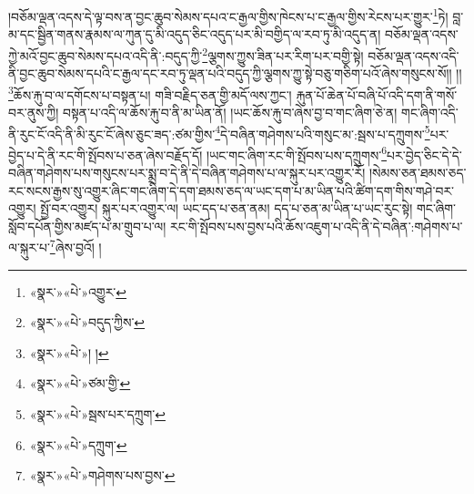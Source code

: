 །བཅོམ་ལྡན་འདས་དེ་ལྟ་བས་ན་བྱང་ཆུབ་སེམས་དཔའ་ང་རྒྱལ་གྱིས་ཁེངས་པ་ང་རྒྱལ་གྱིས་རེངས་པར་གྱུར་\footnote{«སྣར་»«པེ་»འགྱུར་}ཏེ། བླ་མ་དང་སྦྱིན་གནས་རྣམས་ལ་ཀུན་དུ་མི་འདུད་ཅིང་འདུད་པར་མི་བགྱིད་ལ་རབ་ཏུ་མི་འདུད་ན། བཅོམ་ལྡན་འདས་ཀྱེ་མའོ་བྱང་ཆུབ་སེམས་དཔའ་འདི་ནི་:བདུད་ཀྱི་\footnote{«སྣར་»«པེ་»བདུད་ཀྱིས་}ལྕགས་ཀྱུས་ཟིན་པར་རིག་པར་བགྱི་སྟེ། བཅོམ་ལྡན་འདས་འདི་ནི་བྱང་ཆུབ་སེམས་དཔའི་ང་རྒྱལ་དང་རབ་ཏུ་ལྡན་པའི་བདུད་ཀྱི་ལྕགས་ཀྱུ་སྟེ་བཅུ་གཅིག་པའོ་ཞེས་གསུངས་སོ།། །།\footnote{«སྣར་»«པེ་»། །}ཆོས་རྐུ་བ་ལ་དགོངས་པ་བསྟན་པ། གཟི་བརྗིད་ཅན་གྱི་མདོ་ལས་ཀྱང་། རྐུན་པོ་ཆེན་པོ་བཞི་པོ་འདི་དག་ནི་གསོ་བར་ནུས་ཀྱི། བསྟན་པ་འདི་ལ་ཆོས་རྐུ་བ་ནི་མ་ཡིན་ནོ། །ཡང་ཆོས་རྐུ་བ་ཞེས་བྱ་བ་གང་ཞིག་ཅེ་ན། གང་ཞིག་འདི་ནི་རུང་ངོ་འདི་ནི་མི་རུང་ངོ་ཞེས་ཅུང་ཟད་:ཙམ་གྱིས་\footnote{«སྣར་»«པེ་»ཙམ་གྱི་}དེ་བཞིན་གཤེགས་པའི་གསུང་མ་:སྦས་པ་དཀྲུགས་\footnote{«སྣར་»«པེ་»སྦས་པར་དཀྲུག་}པར་བྱེད་པ་དེ་ནི་རང་གི་སྤོབས་པ་ཅན་ཞེས་བརྗོད་དོ། །ཡང་གང་ཞིག་རང་གི་སྤོབས་པས་དཀྲུགས་\footnote{«སྣར་»«པེ་»དཀྲུག་}པར་བྱེད་ཅིང་དེ་དེ་བཞིན་གཤེགས་པས་གསུངས་པར་སྨྲ་བ་དེ་ནི་དེ་བཞིན་གཤེགས་པ་ལ་སྐུར་པར་འགྱུར་རོ། །སེམས་ཅན་ཐམས་ཅད་རང་སངས་རྒྱས་སུ་འགྱུར་ཞིང་གང་ཞིག་དེ་དག་ཐམས་ཅད་ལ་ཡང་དག་པ་མ་ཡིན་པའི་ཚིག་དག་གིས་གཤེ་བར་འགྱུར། སྤྱོ་བར་འགྱུར། སྐུར་པར་འགྱུར་ལ། ཡང་དད་པ་ཅན་ནམ། དད་པ་ཅན་མ་ཡིན་པ་ཡང་རུང་སྟེ། གང་ཞིག་སློབ་དཔོན་གྱིས་མཛད་པ་མ་གྲུབ་པ་ལ། རང་གི་སྤོབས་པས་བྱས་པའི་ཆོས་འཇུག་པ་འདི་ནི་དེ་བཞིན་:གཤེགས་པ་ལ་སྐུར་པ་\footnote{«སྣར་»«པེ་»གཤེགས་པས་བྱས་}ཞེས་བྱའོ། །
